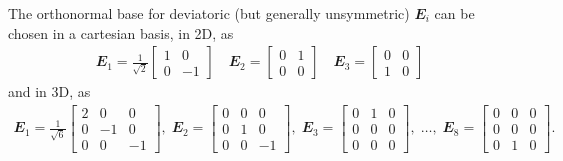\documentclass[12pt,a4paper,fleqn]{article}
\renewcommand{\ts}[1]{\mathbfit{#1}}
\begin{document}
The orthonormal base for deviatoric (but generally unsymmetric) $\ts E_i$ can be chosen in a cartesian basis, in 2D, as
\begin{align}
 \ts E_1 = \frac{1}{\sqrt{2}}\begin{bmatrix} 1 & 0\\ 0 & -1\end{bmatrix}
\quad \ts E_2 = \begin{bmatrix} 0 & 1\\ 0 & 0\end{bmatrix}
\quad \ts E_3 = \begin{bmatrix} 0 & 0\\ 1 & 0\end{bmatrix}
\end{align}
and in 3D, as
\begin{equation}
\begin{gathered}
 \ts E_1 = \frac{1}{\sqrt{6}}\left[\begin{smallmatrix} 2 & 0 & 0\\ 0 & -1 & 0\\ 0 & 0 & -1\end{smallmatrix}\right],\;
 \ts E_2 = \left[\begin{smallmatrix} 0 & 0 & 0\\ 0 & 1 & 0 \\ 0 & 0 & -1\end{smallmatrix}\right],\;
 \ts E_3 = \left[\begin{smallmatrix} 0 & 1 & 0\\ 0 & 0 & 0 \\ 0 & 0 & 0\end{smallmatrix}\right],\;
 \ldots,\;
 \ts E_8 = \left[\begin{smallmatrix} 0 & 0 & 0\\ 0 & 0 & 0 \\ 0 & 1 & 0\end{smallmatrix}\right].
\end{gathered}
\end{equation}
\end{document}
